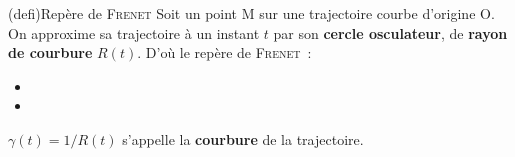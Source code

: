 \documentclass[../../main/main.tex]{subfiles}
\begin{document}
\begin{tcb*}[sidebyside, righthand ratio=.4](defi){Repère de \textsc{Frenet}}
  Soit un point M sur une trajectoire courbe d'origine O. On approxime sa
  trajectoire à un instant $t$ par son \textbf{cercle osculateur}, de \textbf{rayon
  de courbure} $R(t)$. D'où le repère de \textsc{Frenet}~:
    \begin{itemize}
      \item {}
      \item {}%
    \end{itemize}
    $\gamma(t) = 1/R(t)$ s'appelle la \textbf{courbure} de
  la trajectoire.
    \tcblower
    \begin{center}
      \vspace{-15pt}
    \end{center}
\end{tcb*}
\end{document}
